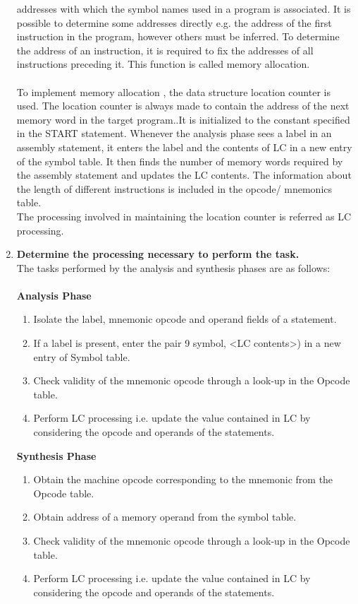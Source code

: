 \documentclass[12pt]{article}
\begin{document}
\begin{enumerate}
addresses with which the symbol names used in a program is associated. It is
possible to determine some addresses directly e.g. the address of the first instruction
in the program, however others must be inferred. To determine the address of an
instruction, it is required to fix the addresses of all instructions preceding it. This
function is called memory allocation.\\\\To implement memory allocation , the data structure location counter is used. The
location counter is always made to contain the address of the next memory word in
the target program..It is initialized to the constant specified in the START statement.
Whenever the analysis phase sees a label in an assembly statement, it enters the
label and the contents of LC in a new entry of the symbol table. It then finds the
number of memory words required by the assembly statement and updates the LC
contents. The information about the length of different instructions is included in the
opcode/ mnemonics table.\\The processing involved in maintaining the location counter is referred as LC processing.
\item \textbf{Determine the processing necessary to perform the task.}\\The tasks performed by the analysis and synthesis phases are as follows:\\\\\textbf{Analysis Phase}\begin{enumerate}
\item Isolate the label, mnemonic opcode and operand fields of a statement.
\item If a label is present, enter the pair 9 symbol, <LC contents>) in a new entry of
Symbol table.
\item Check validity of the mnemonic opcode through a look-up in the Opcode table.
\item Perform LC processing i.e. update the value contained in LC by considering the
opcode and operands of the statements.
\end{enumerate}\textbf{Synthesis Phase}\begin{enumerate}
\item Obtain the machine opcode corresponding to the mnemonic from the Opcode table.
\item Obtain address of a memory operand from the symbol table.
\item Check validity of the mnemonic opcode through a look-up in the Opcode table.
\item Perform LC processing i.e. update the value contained in LC by considering the
opcode and operands of the statements.
\end{enumerate}
\end{enumerate}
\end{document}
